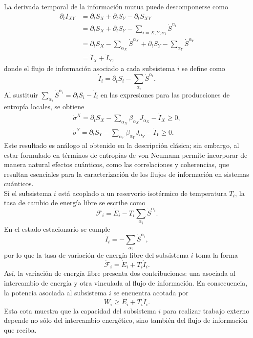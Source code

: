 La derivada temporal de la información mutua puede descomponerse como
\begin{align*}
    \partial_{t}I_{XY} & = \partial_{t}S_{X} + \partial_{t}S_{Y} - \partial_{t}S_{XY} \\
        & = \partial_{t}S_{X} + \partial_{t}S_{Y} - \sum_{i=X,Y;\alpha_{i}}\dot{S}^{\alpha_{i}} \\
        & = \partial_{t}S_{X} - \sum_{\alpha_{X}} \dot{S}^{\alpha_{X}} + \partial_{t}S_{Y} - \sum_{\alpha_{Y}} \dot{S}^{\alpha_{Y}} \\
        & = \dot{I}_{X} + \dot{I}_{Y},
\end{align*}
donde el flujo de información asociado a cada subsistema $i$ se define como
\[
    \dot{I}_{i} = \partial_{t} S_{i} - \sum_{\alpha_{i}} \dot{S}^{\alpha_{i}}.
\]
Al sustituir $\sum_{\alpha_{i}} \dot{S}^{\alpha_{i}} = \partial_{t} S_{i} - \dot{I}_{i}$ en las expresiones para las producciones de entropía locales, se obtiene
\begin{align}
    \dot{\sigma}^{X} = \partial_{t}S_{X} - \sum_{\alpha_{X}} \beta_{\alpha_{X}} J_{\alpha_{X}} - \dot{I}_{X} \geq 0, \\
    \dot{\sigma}^{Y} = \partial_{t}S_{Y} - \sum_{\alpha_{Y}} \beta_{\alpha_{Y}} J_{\alpha_{Y}} - \dot{I}_{Y} \geq 0.
    \label{sec4:localentropyquantum}
\end{align}
Este resultado es análogo al obtenido en la descripción clásica; sin embargo, al estar formulado en términos de entropías de von Neumann permite incorporar de manera natural efectos cuánticos, como las correlaciones y coherencias, que resultan esenciales para la caracterización de los flujos de información en sistemas cuánticos.
\\

Si el subsistema $i$ está acoplado a un reservorio isotérmico de temperatura $T_i$, la tasa de cambio de energía libre se escribe como
\[
    \dot{\mathcal{F}}_{i} = \dot{E}_{i} - T_{i} \sum_{\alpha_{i}}\dot{S}^{\alpha_{i}}.
\]
En el estado estacionario se cumple
\[
    \dot{I}_{i} = - \sum_{\alpha_{i}}\dot{S}^{\alpha_{i}},
\]
por lo que la tasa de variación de energía libre del subsistema $i$ toma la forma
\[
    \dot{\mathcal{F}}_{i} = \dot{E}_{i} + T_{i} \dot{I}_{i}.
\]
Así, la variación de energía libre presenta dos contribuciones: una asociada al intercambio de energía y otra vinculada al flujo de información. En consecuencia, la potencia asociada al subsistema $i$ se encuentra acotada por
\[
    \dot{W}_{i} \geq \dot{E}_{i} + T_{i}\dot{I}_{i}.
\]
Esta cota muestra que la capacidad del subsistema $i$ para realizar trabajo externo depende no sólo del intercambio energético, sino también del flujo de información que reciba.
\\

